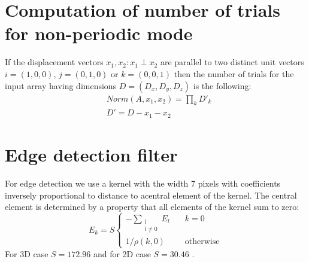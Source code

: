 \documentclass[reprint,amsmath,amssymb,aps,pre,showkeys,showpacs]{revtex4-1}
\begin{document}
\section{Computation of number of trials for non-periodic mode}
\label{sec:number-of-trials}
If the displacement vectors $x_1, x_2: x_1 \perp x_2$ are parallel to two
distinct unit vectors $i=(1,0,0)$, $j=(0,1,0)$ or $k=(0,0,1)$ then the number of
trials for the input array having dimensions $D = (D_x, D_y, D_z)$ is the
following:
\begin{equation}
  \begin{aligned}
    & Norm(A, x_1, x_2) = \prod_k D'_k \\
    & D' = D - x_1 - x_2
  \end{aligned}
\end{equation}

\section{Edge detection filter}
\label{sec:filter}
For edge detection we use a kernel with the width 7 pixels with coefficients
inversely proportional to distance to acentral element of the kernel. The
central element is determined by a property that all elements of the kernel sum
to zero:
\begin{equation}
  E_k = S \left\{
  \begin{array}{ll}
    -\sum\limits_{\substack{l \\ l \ne 0}} E_l & \quad k = 0 \\
    1 / \rho(k, 0) & \quad \text{otherwise}
  \end{array}
  \right.
\end{equation}
For 3D case $S=172.96$ and for 2D case $S=30.46$ \cite{postnicov20232}.
\end{document}

